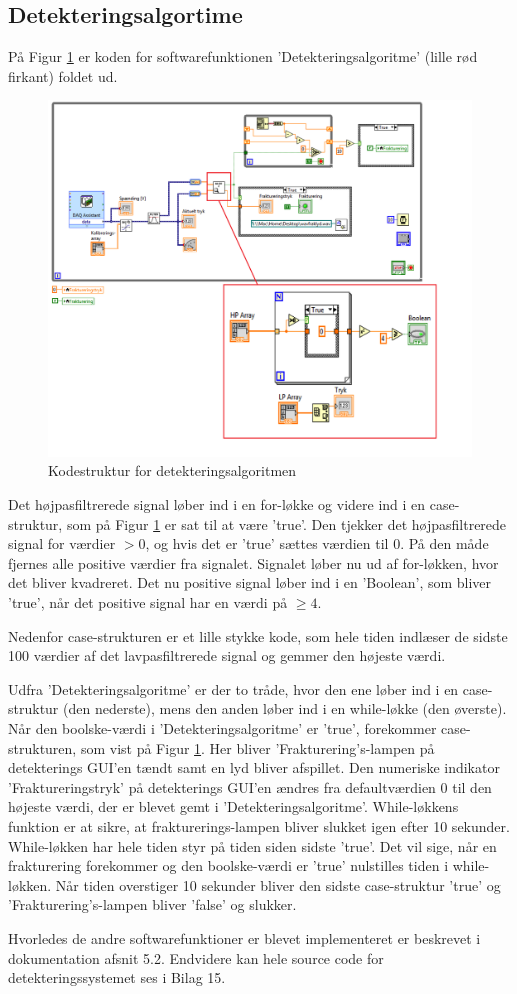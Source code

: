 \subsection{Detekteringsalgortime}
På Figur \ref{SW_4} er koden for softwarefunktionen 'Detekteringsalgoritme' (lille rød firkant) foldet ud. 

\begin{figure}[H]
	\centering
	\includegraphics[width=1\textwidth]{Figure/SW_4}
	\caption{Kodestruktur for detekteringsalgoritmen}
	\label{SW_4}
\end{figure} 

Det højpasfiltrerede signal løber ind i en for-løkke og videre ind i en case-struktur, som på Figur \ref{SW_4} er sat til at være 'true'. Den tjekker det højpasfiltrerede signal for værdier $>0$, og hvis det er 'true' sættes værdien til 0. På den måde fjernes alle positive værdier fra signalet. Signalet løber nu ud af for-løkken, hvor det bliver kvadreret. Det nu positive signal løber ind i en 'Boolean', som bliver 'true', når det positive signal har en værdi på $\geq4$. 

Nedenfor case-strukturen er et lille stykke kode, som hele tiden indlæser de sidste 100 værdier af det lavpasfiltrerede signal og gemmer den højeste værdi.    

Udfra 'Detekteringsalgoritme' er der to tråde, hvor den ene løber ind i en case-struktur (den nederste), mens den anden løber ind i en while-løkke (den øverste). Når den boolske-værdi i 'Detekteringsalgoritme' er 'true', forekommer case-strukturen, som vist på Figur \ref{SW_4}. Her bliver 'Frakturering's-lampen på detekterings GUI'en tændt samt en lyd bliver afspillet. Den numeriske indikator 'Fraktureringstryk' på detekterings GUI'en ændres fra defaultværdien 0 til den højeste værdi, der er blevet gemt i 'Detekteringsalgoritme'. While-løkkens funktion er at sikre, at frakturerings-lampen bliver slukket igen efter 10 sekunder. While-løkken har hele tiden styr på tiden siden sidste 'true'. Det vil sige, når en frakturering forekommer og den boolske-værdi er 'true' nulstilles tiden i while-løkken. Når tiden overstiger 10 sekunder bliver den sidste case-struktur 'true' og 'Frakturering's-lampen bliver 'false' og slukker.    

Hvorledes de andre softwarefunktioner er blevet implementeret er beskrevet i dokumentation afsnit 5.2. Endvidere kan hele source code for detekteringssystemet ses i Bilag 15.    






